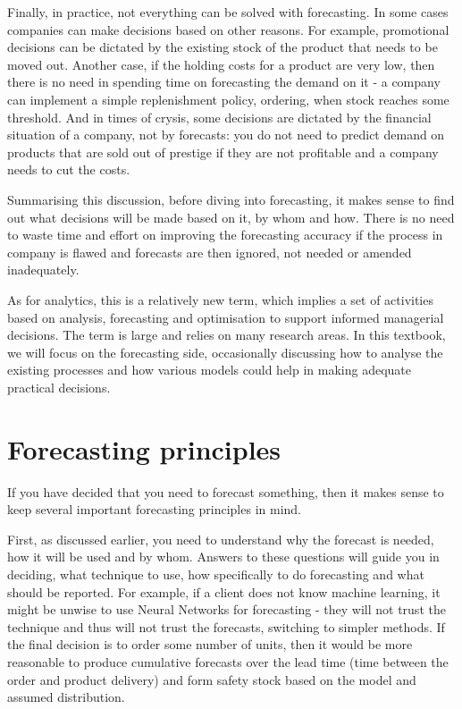 \documentclass[
]{book}
\theoremstyle{definition}
\theoremstyle{definition}
\theoremstyle{definition}
\theoremstyle{definition}
\theoremstyle{remark}
\begin{document}
Finally, in practice, not everything can be solved with forecasting. In some cases companies can make decisions based on other reasons. For example, promotional decisions can be dictated by the existing stock of the product that needs to be moved out. Another case, if the holding costs for a product are very low, then there is no need in spending time on forecasting the demand on it - a company can implement a simple replenishment policy, ordering, when stock reaches some threshold. And in times of crysis, some decisions are dictated by the financial situation of a company, not by forecasts: you do not need to predict demand on products that are sold out of prestige if they are not profitable and a company needs to cut the costs.

Summarising this discussion, before diving into forecasting, it makes sense to find out what decisions will be made based on it, by whom and how. There is no need to waste time and effort on improving the forecasting accuracy if the process in company is flawed and forecasts are then ignored, not needed or amended inadequately.

As for analytics, this is a relatively new term, which implies a set of activities based on analysis, forecasting and optimisation to support informed managerial decisions. The term is large and relies on many research areas. In this textbook, we will focus on the forecasting side, occasionally discussing how to analyse the existing processes and how various models could help in making adequate practical decisions.

\hypertarget{forecasting-principles}{%
\section{Forecasting principles}\label{forecasting-principles}}

If you have decided that you need to forecast something, then it makes sense to keep several important forecasting principles in mind.

First, as discussed earlier, you need to understand why the forecast is needed, how it will be used and by whom. Answers to these questions will guide you in deciding, what technique to use, how specifically to do forecasting and what should be reported. For example, if a client does not know machine learning, it might be unwise to use Neural Networks for forecasting - they will not trust the technique and thus will not trust the forecasts, switching to simpler methods. If the final decision is to order some number of units, then it would be more reasonable to produce cumulative forecasts over the lead time (time between the order and product delivery) and form safety stock based on the model and assumed distribution.
\end{document}
